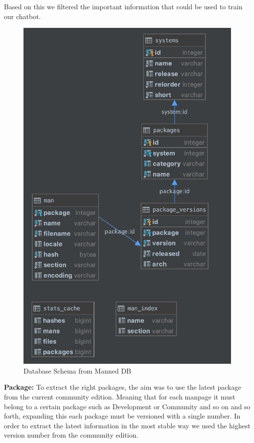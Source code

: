 Based on this we filtered the important information that could be used to train our chatbot.
\newline
\begin{figure}[h!]
    \centering
    \includegraphics[scale=0.70]{OriginalDB.png}
    \caption{Database Schema from Manned DB}
    \label{fig:manned_original}
\end{figure}

\textbf{Package:}
To extract the right packages, the aim was to use the latest package from the current community edition. Meaning that for each manpage it must belong to a certain package such as Development or Community and so on and so forth, expanding this each package must be versioned with a single number. In order to extract the latest information in the most stable way we used the highest version number from the community edition. 

